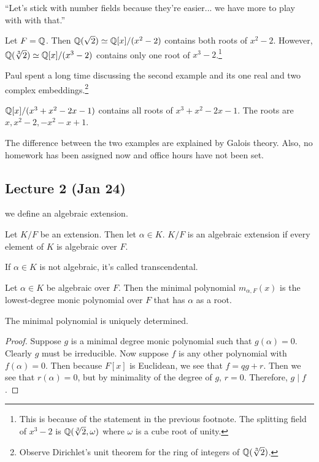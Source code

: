 \documentclass[10pt, twoside]{article}
\begin{document}
    ``Let's stick with number fields because they're easier... we have more to
    play with with that.''

    \begin{exm} Let $F = \mathbb{Q}$. Then $\mathbb{Q}(\sqrt{2}) \simeq \mathbb{Q}[x]/(x^2-2)$ contains
        both roots of $x^2-2$. However, $\mathbb{Q}(\sqrt[3]{2}) \simeq \mathbb{Q}[x]/(x^3-2)$
        contains only one root of $x^3-2$.\footnote{This is because of the
        statement in the previous footnote. The splitting field of $x^3-2$ is
    $\mathbb{Q}(\sqrt[3]{2}, \omega)$ where $\omega$ is a cube root of unity.}
\end{exm}

    Paul spent a long time discussing the second example and its one real and
    two complex embeddings.\footnote{Observe Dirichlet's unit theorem for the
    ring of integers of $\mathbb{Q}(\sqrt[3]{2})$.}

    \begin{exm} $\mathbb{Q}[x]/(x^3+x^2-2x-1)$ contains all roots of $x^3+x^2-2x-1$.
    The roots are $x, x^2-2, -x^2-x+1$.  \end{exm}

    The difference between the two examples are explained by Galois theory.
    Also, no homework has been assigned now and office hours have not been set.

    \subsection{Lecture 2 (Jan 24)}%
    we define an algebraic extension.

    \begin{defn} Let $K/F$ be an extension. Then let
    $\alpha \in K$. $K/F$ is an algebraic extension if every element of $K$ is
algebraic over $F$.  \end{defn}

    If $\alpha \in K$ is not algebraic, it's called transcendental.

    \begin{defn} Let $\alpha \in K$ be algebraic over $F$.
    Then the minimal polynomial $m_{\alpha,F}(x)$ is the lowest-degree monic
polynomial over $F$ that has $\alpha$ as a root.  \end{defn}

    \begin{prop} The minimal polynomial is uniquely determined.  \begin{proof}
        Suppose $g$ is a minimal degree monic polynomial such that $g(\alpha) =
        0$. Clearly $g$ must be irreducible. Now suppose $f$ is any other
        polynomial with $f(\alpha) = 0$. Then because $F[x]$ is Euclidean, we
        see that $f = qg+r$. Then we see that $r(\alpha) = 0$, but by
        minimality of the degree of $g$, $r=0$. Therefore, $g \mid f$.
    \end{proof} \end{prop}
\end{document}

